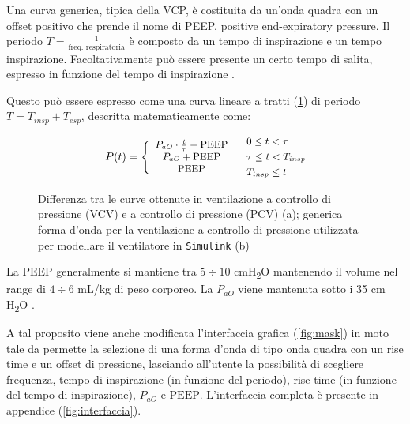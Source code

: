 Una curva generica, tipica della VCP, è costituita da un'onda quadra con un offset positivo che prende il nome di PEEP, positive end-expiratory pressure. Il periodo $T=\frac{1}{\text{freq. respiratoria}}$ è composto da un tempo di inspirazione e un tempo inspirazione. Facoltativamente può essere presente un certo tempo di salita, espresso in funzione del tempo di inspirazione \cite{al-naggar_modelling_2015}. 

Questo può essere espresso come una curva lineare a tratti (\cref{fig:PCV}) di periodo $T=T_{insp}+T_{esp}$, descritta matematicamente come:

\begin{equation}
	\small{
	P(t)=\left\{\begin{array}{c}
		P_{aO} \cdot \frac{t}{\tau}+\mathrm{PEEP} \\
		P_{aO}+\mathrm{PEEP} \\
		\mathrm{PEEP}
	\end{array}\right.\quad \begin{aligned}
		&0 \leq t < \tau \\
		&\tau \leq t < T_{insp} \\
		&T_{insp} \leq t 
	\end{aligned}}
\end{equation}

 \begin{figure}[t!]
	\begin{subfigure}[b]{0.5\linewidth}
		\centering
		\footnotesize{
			\def\svgwidth{\linewidth}
			}
		\caption{}
	\end{subfigure}\hfill
	\begin{subfigure}[b]{0.5\linewidth}
		\centering
		\footnotesize{
			\def\svgwidth{\linewidth}
			}
		\caption{}
		\label{fig:PCV}
	\end{subfigure}
	\caption{Differenza tra le curve ottenute in ventilazione a controllo di pressione (VCV) e a controllo di pressione (PCV) (a); generica forma d'onda per la ventilazione a controllo di pressione utilizzata per modellare il ventilatore in \texttt{Simulink} (b)}
	\label{fig:clinical}
\end{figure}

La PEEP generalmente si mantiene tra $5\div 10$ cmH\textsubscript{2}O mantenendo il volume nel range di $4\div 6$ mL/kg di peso corporeo. La $P_{aO}$ viene mantenuta sotto i 35 cm H\textsubscript{2}O \cite{ball_modes_2015,article}.

A tal proposito viene anche modificata l'interfaccia grafica (\cref{fig:mask}) in moto tale da permette la selezione di una forma d'onda di tipo onda quadra con un rise time e un offset di pressione, lasciando all'utente la possibilità di scegliere frequenza, tempo di inspirazione (in funzione del periodo), rise time (in funzione del tempo di inspirazione), $P_{aO}$ e $\mathrm{PEEP}$. L'interfaccia completa è presente in appendice (\cref{fig:interfaccia}).
 


